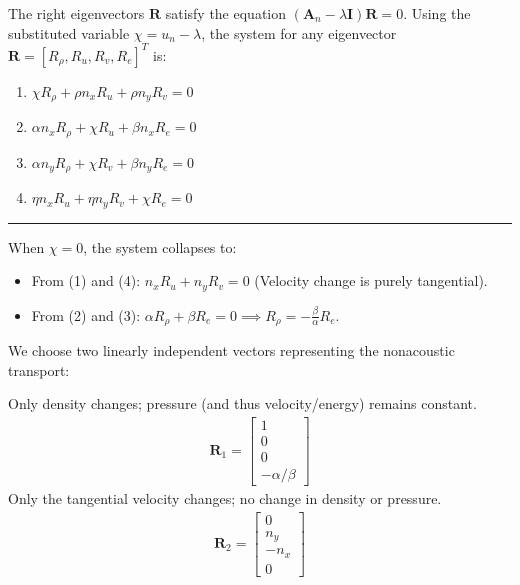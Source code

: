 \documentclass[letterpaper,10pt,english]{jupyterBook}
\begin{document}
\sphinxAtStartPar
The right eigenvectors \(\mathbf{R}\) satisfy the equation \((\mathbf{A}_n - \lambda \mathbf{I})\mathbf{R} = 0\). Using the substituted variable \(\chi = u_n - \lambda\), the system for any eigenvector \(\mathbf{R} = [R_\rho, R_u, R_v, R_e]^T\) is:
\begin{enumerate}
%
\item {} 
\sphinxAtStartPar
\(\chi R_\rho + \rho n_x R_u + \rho n_y R_v = 0\)

\item {} 
\sphinxAtStartPar
\(\alpha n_x R_\rho + \chi R_u + \beta n_x R_e = 0\)

\item {} 
\sphinxAtStartPar
\(\alpha n_y R_\rho + \chi R_v + \beta n_y R_e = 0\)

\item {} 
\sphinxAtStartPar
\(\eta n_x R_u + \eta n_y R_v + \chi R_e = 0\)

\end{enumerate}


\bigskip\hrule\bigskip


\sphinxAtStartPar
{}
When \(\chi = 0\), the system collapses to:
\begin{itemize}
\item {} 
\sphinxAtStartPar
From (1) and (4): \(n_x R_u + n_y R_v = 0\) (Velocity change is purely tangential).

\item {} 
\sphinxAtStartPar
From (2) and (3): \(\alpha R_\rho + \beta R_e = 0 \implies R_\rho = -\frac{\beta}{\alpha} R_e\).

\end{itemize}

\sphinxAtStartPar
We choose two linearly independent vectors representing the non\sphinxhyphen{}acoustic transport:

\sphinxAtStartPar
{}
Only density changes; pressure (and thus velocity/energy) remains constant.
\begin{equation*}
\begin{split} \mathbf{R}_1 = \begin{bmatrix} 1 \\ 0 \\ 0 \\ -\alpha/\beta \end{bmatrix} \end{split}
\end{equation*}
\sphinxAtStartPar
{}
Only the tangential velocity changes; no change in density or pressure.
\begin{equation*}
\begin{split} \mathbf{R}_2 = \begin{bmatrix} 0 \\ n_y \\ -n_x \\ 0 \end{bmatrix} \end{split}
\end{equation*}
\end{document}
